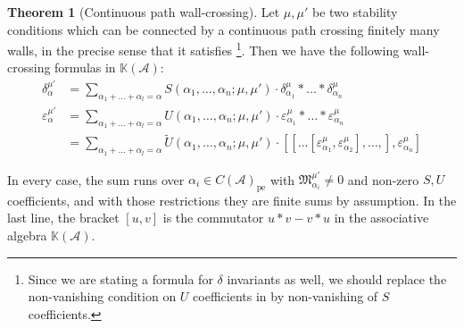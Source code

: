 \documentclass[12pt]{amsart}
\theoremstyle{definition}
\newtheorem{theorem}[definition]{Theorem}
\newcommand{\BK}{{\mathbb{K}}}
\newcommand{\CA}{{\mathcal A}}
\newcommand{\1}{\mathbf 1}
\newcommand{\FM}{{\mathfrak{M}}}
\newcommand{\pe}{\mathrm{pe}}
\begin{document}
\begin{theorem}[Continuous path wall-crossing]\label{thm: generalwc}
    Let $\mu, \mu'$ be two stability conditions which can be connected by a continuous path crossing finitely many walls, in the precise sense that it satisfies \cite[Assumption 5.3]{joyce}\footnote{Since we are stating a formula for $\delta$ invariants as well, we should replace the non-vanishing condition on $U$ coefficients in \cite[Assumption 5.3]{joyce} by non-vanishing of $S$ coefficients.}. Then we have the following wall-crossing formulas in $\BK(\CA)$:
    \begin{align}\label{eq: deltawc}\delta_{\alpha}^{\mu'}&=\sum_{\alpha_1+\ldots+\alpha_l=\alpha}S(\alpha_1, \ldots, \alpha_n; \mu, \mu')\cdot \delta_{\alpha_1}^{\mu}\ast \ldots\ast \delta_{\alpha_n}^{\mu}\\
    \varepsilon_{\alpha}^{\mu'}&=\sum_{\alpha_1+\ldots+\alpha_l=\alpha}U(\alpha_1, \ldots, \alpha_n; \mu, \mu')\cdot \varepsilon_{\alpha_1}^{\mu}\ast \ldots\ast \varepsilon_{\alpha_n}^{\mu}\label{eq: epsilonwc}\\
    &\nonumber=\sum_{\alpha_1+\ldots+\alpha_l=\alpha}\tilde U(\alpha_1, \ldots, \alpha_n; \mu, \mu')\cdot [[\ldots [\varepsilon_{\alpha_1}^{\mu}, \varepsilon_{\alpha_2}^\mu], \ldots, ],\varepsilon_{\alpha_n}^{\mu}]
    \end{align}

    In every case, the sum runs over $\alpha_i\in C(\CA)_{\pe}$ with $\FM^{\mu'}_{\alpha_i}\neq 0$ and non-zero $S, U$ coefficients, and with those restrictions they are finite sums by assumption. In the last line, the bracket $[u,v]$ is the commutator $u\ast v-v\ast u$ in the associative algebra $\BK(\CA)$.
\end{theorem}
\end{document}
